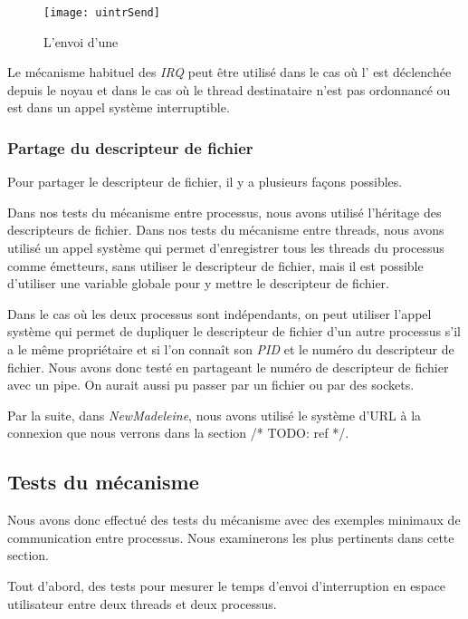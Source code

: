 \begin{figure}[H]
  \texttt{[image: uintrSend]}
  \caption{L'envoi d'une \uintr{}}
  \label{fig:sendUintr}
\end{figure}

Le mécanisme habituel des \emph{IRQ} peut être utilisé dans le cas où l'\uintr{} est déclenchée depuis le noyau et
dans le cas où le thread destinataire n'est pas ordonnancé ou est dans un appel système interruptible.

\subsubsection{Partage du descripteur de fichier}
\label{sec:shareFD}

Pour partager le descripteur de fichier, il y a plusieurs façons possibles.

Dans nos tests du mécanisme entre processus, nous avons utilisé l'héritage des descripteurs de fichier.
Dans nos tests du mécanisme entre threads, nous avons utilisé un appel système qui permet d'enregistrer tous les threads du processus comme émetteurs, sans utiliser le descripteur de fichier, %
mais il est possible d'utiliser une variable globale pour y mettre le descripteur de fichier.

Dans le cas où les deux processus sont indépendants, on peut utiliser l'appel système  qui permet de dupliquer le descripteur de fichier d'un autre processus s'il a le même propriétaire et si l'on connaît son \emph{PID} et le numéro du descripteur de fichier.
Nous avons donc testé en partageant le numéro de descripteur de fichier avec un pipe.
On aurait aussi pu passer par un fichier ou par des sockets.

Par la suite, dans \emph{NewMadeleine}, nous avons utilisé le système d'URL à la connexion que nous verrons dans la section /* TODO: ref */.

\subsection{Tests du mécanisme}

Nous avons donc effectué des tests du mécanisme avec des exemples minimaux de communication entre processus.
Nous examinerons les plus pertinents dans cette section.

Tout d'abord, des tests pour mesurer le temps d'envoi d'interruption en espace utilisateur entre deux threads et deux processus.

